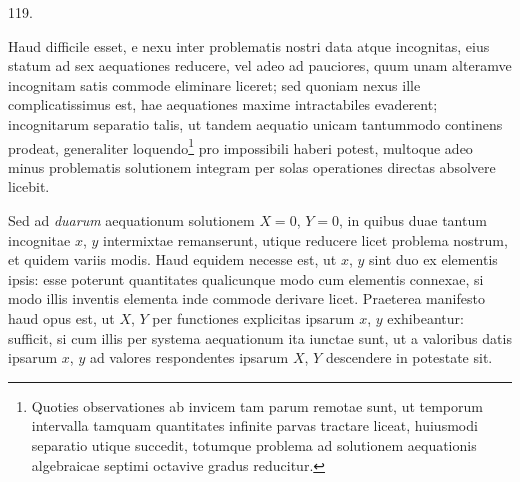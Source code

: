 \par\medskip
\begin{center}\hypertarget{native-166-article119}{}119.\end{center}
Haud difficile esset, e nexu inter problematis nostri data atque incognitas, eius statum ad sex aequationes reducere, vel adeo ad pauciores, quum unam alteramve incognitam satis commode eliminare liceret; sed quoniam nexus ille complicatissimus est, hae aequationes maxime intractabiles evaderent; incognitarum separatio talis, ut tandem aequatio unicam tantummodo continens prodeat, generaliter loquendo\footnote{Quoties observationes ab invicem tam parum remotae sunt, ut temporum intervalla tamquam quantitates infinite parvas tractare liceat, huiusmodi separatio utique succedit, totumque problema ad solutionem aequationis algebraicae septimi octavive gradus reducitur.} pro impossibili haberi potest, multoque adeo minus problematis solutionem integram per solas operationes directas absolvere licebit.

Sed ad \emph{duarum} aequationum solutionem $X=0$, $Y=0$, in quibus duae tantum incognitae $x$, $y$ intermixtae remanserunt, utique reducere licet problema nostrum, et quidem variis modis. Haud equidem necesse est, ut $x$, $y$ sint duo ex elementis ipsis: esse poterunt quantitates qualicunque modo cum elementis connexae, si modo illis inventis elementa inde commode derivare licet. Praeterea manifesto haud opus est, ut $X$, $Y$ per functiones explicitas ipsarum $x$, $y$ exhibeantur: sufficit, si cum illis per systema aequationum ita iunctae sunt, ut a valoribus datis ipsarum $x$, $y$ ad valores respondentes ipsarum $X$, $Y$ descendere in potestate sit.

